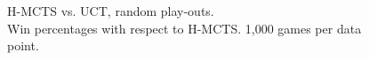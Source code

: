 \begin{figure}[ht]
     \caption[H-MCTS $B$ values]{H-MCTS vs. UCT, random play-outs. \\ Win percentages with respect to H-MCTS. 1,000 games per data point.}
     \label{fig:h-mcts_v_uct}
\end{figure}

